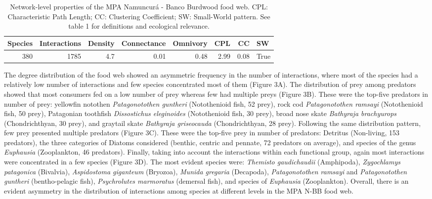 \documentclass[preprint, 3p,
authoryear]{elsarticle} %
\begin{document}
\begin{table}

\caption{\label{tab:table2}Network-level properties of the MPA Namuncurá - Banco Burdwood food web. CPL: Characteristic Path Length; CC: Clustering Coefficient; SW: Small-World pattern. See table 1 for definitions and ecological relevance.}
\centering
\begin{tabular}[t]{r|r|r|r|r|r|r|l}
\hline
\textbf{Species} & \textbf{Interactions} & \textbf{Density} & \textbf{Connectance} & \textbf{Omnivory} & \textbf{CPL} & \textbf{CC} & \textbf{SW}\\
\hline
380 & 1785 & 4.7 & 0.01 & 0.48 & 2.99 & 0.08 & True\\
\hline
\end{tabular}
\end{table}

The degree distribution of the food web showed an asymmetric frequency
in the number of interactions, where most of the species had a
relatively low number of interactions and few species concentrated most
of them (Figure 3A). The distribution of prey among predators showed
that most consumers fed on a low number of prey whereas few had multiple
preys (Figure 3B). These were the top-five predators in number of prey:
yellowfin notothen \emph{Patagonotothen guntheri} (Notothenioid fish, 52
prey), rock cod \emph{Patagonotothen ramsayi} (Notothenioid fish, 50
prey), Patagonian toothfish \emph{Dissostichus eleginoides}
(Notothenioid fish, 30 prey), broad nose skate \emph{Bathyraja
brachyurops} (Chondrichthyan, 30 prey), and graytail skate
\emph{Bathyraja griseocauda} (Chondrichthyan, 28 prey). Following the
same distribution pattern, few prey presented multiple predators (Figure
3C). These were the top-five prey in number of predators: Detritus
(Non-living, 153 predators), the three categories of Diatoms considered
(benthic, centric and pennate, 72 predators on average), and species of
the genus \emph{Euphausia} (Zooplankton, 46 predators). Finally, taking
into account the interactions within each functional group, again most
interactions were concentrated in a few species (Figure 3D). The most
evident species were: \emph{Themisto gaudichaudii} (Amphipoda),
\emph{Zygochlamys patagonica} (Bivalvia), \emph{Aspidostoma giganteum}
(Bryozoa), \emph{Munida gregaria} (Decapoda), \emph{Patagonotothen
ramsayi} and \emph{Patagonotothen guntheri} (bentho-pelagic fish),
\emph{Psychrolutes marmoratus} (demersal fish), and species of
\emph{Euphausia} (Zooplankton). Overall, there is an evident asymmetry
in the distribution of interactions among species at different levels in
the MPA N-BB food web.
\end{document}
